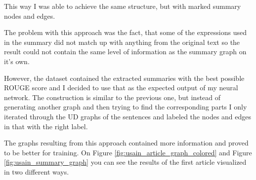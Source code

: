 This way I was able to achieve the same structure, but with marked summary nodes and edges.

The problem with this approach was the fact, that some of the expressions used in the summary did not match up with anything from the original text so the result could not contain the same level of information as the summary graph on it's own.

However, the dataset contained the extracted summaries with the best possible ROUGE score and I decided to use that as the expected output of my neural network. The construction is similar to the previous one, but instead of generating another graph and then trying to find the corresponding parts I only iterated through the UD graphs of the sentences and labeled the nodes and edges in that with the right label.

The graphs resulting from this approach contained more information and proved to be better for training. On Figure \ref{fig:usain_article_graph_colored} and Figure \ref{fig:usain_summary_graph} you can see the results of the first article visualized in two different ways.
